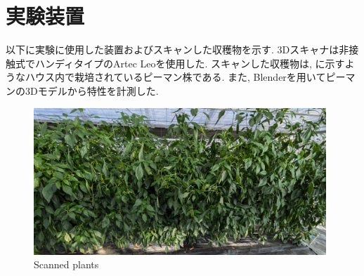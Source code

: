 \section{実験装置}
以下に実験に使用した装置およびスキャンした収穫物を示す.
3Dスキャナは非接触式でハンディタイプのArtec Leoを使用した.
スキャンした収穫物は, に示すようなハウス内で栽培されているピーマン株である.
また, Blenderを用いてピーマンの3Dモデルから特性を計測した.

\vspace{5mm}
\begin{figure}[H]
     \centering
     \includegraphics[width=110mm]{images/png/plant.png}
     \caption{Scanned plants}
     \label{Fig:plant}
   \end{figure}